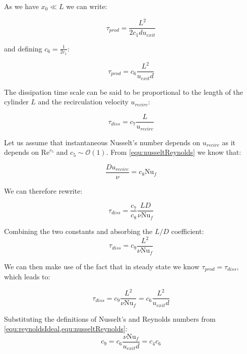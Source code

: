\noindent As we have $x_0\ll L$ we can write:

\begin{equation}
\tau_{prod} = \frac{L^2}{2c_1du_{exit}}
\end{equation}

\noindent and defining $c_6 = \frac{1}{2c_1}$:

\begin{equation}
\tau_{prod} = c_6 \frac{L^2}{u_{exit} d}
\end{equation}

\noindent The dissipation time scale can be said to be proportional to the length of the cylinder $L$ and the recirculation velocity $u_{recirc}$: 

\begin{equation}
\tau_{diss} = c_7 \frac{L}{u_{recirc}}
\end{equation}

\noindent Let us assume that instantaneous Nusselt's number depends on $u_{recirc}$ as it depends on $\text{Re}^{c_5}$ and $c_5\sim\mathcal{O}(1)$. From \cref{equ:nusseltReynolds} we know that: 

\begin{equation}
\frac{D u_{recirc}}{\nu} = c_8 \text{Nu}_f
\end{equation}

\noindent We can therefore rewrite:

\begin{equation}
\tau_{diss} = \frac{c_7}{c_8} \frac{LD}{\nu \text{Nu}_f}
\end{equation}

\noindent Combining the two constants and absorbing the $L/D$ coefficient:
\begin{equation}
\tau_{diss} = c_9 \frac{L^2}{\nu \text{Nu}_f}
\end{equation}

\noindent We can then make use of the fact that in steady state we know $\tau_{prod} = \tau_{diss}$, which leads to:

\begin{equation}
\tau_{diss} = c_9 \frac{L^2}{\nu \text{Nu}_f} = c_6 \frac{L^2}{u_{exit} d}
\end{equation}

\noindent  Substituting the definitions of Nusselt's and Reynolds numbers from \cref{equ:reynoldsIdeal,equ:nusseltReynolds}:
\begin{equation}
c_9 = c_6 \frac{\nu\text{Nu}_f}{u_{exit}d} = c_4 c_6
\end{equation}

